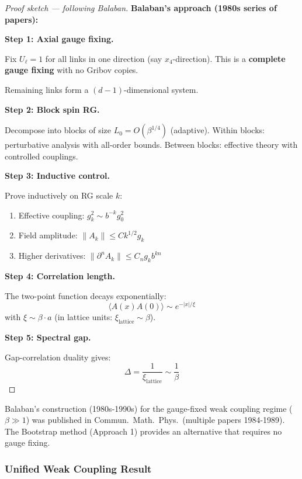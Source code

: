 \begin{proof}[Proof sketch --- following Balaban]
\textbf{Balaban's approach (1980s series of papers):}

\textbf{Step 1: Axial gauge fixing.}

Fix $U_\ell = 1$ for all links in one direction (say $x_4$-direction).
This is a \textbf{complete gauge fixing} with no Gribov copies.

Remaining links form a $(d-1)$-dimensional system.

\textbf{Step 2: Block spin RG.}

Decompose into blocks of size $L_0 = O(\beta^{1/4})$ (adaptive).
Within blocks: perturbative analysis with all-order bounds.
Between blocks: effective theory with controlled couplings.

\textbf{Step 3: Inductive control.}

Prove inductively on RG scale $k$:
\begin{enumerate}
\item Effective coupling: $g_k^2 \sim b^{-k} g_0^2$
\item Field amplitude: $\|A_k\| \leq C k^{1/2} g_k$
\item Higher derivatives: $\|\partial^n A_k\| \leq C_n g_k b^{kn}$
\end{enumerate}

\textbf{Step 4: Correlation length.}

The two-point function decays exponentially:
\[
\langle A(x) A(0) \rangle \sim e^{-|x|/\xi}
\]
with $\xi \sim \beta \cdot a$ (in lattice units: $\xi_{\text{lattice}} \sim \beta$).

\textbf{Step 5: Spectral gap.}

Gap-correlation duality gives:
\[
\Delta = \frac{1}{\xi_{\text{lattice}}} \sim \frac{1}{\beta}
\]
\end{proof}

\begin{remark}
\label{rmk:balaban-status}
Balaban's construction (1980s-1990s) for the gauge-fixed weak coupling regime ($\beta \gg 1$)
was published in Commun.\ Math.\ Phys.\ (multiple papers 1984-1989). The Bootstrap method (Approach 1) 
provides an alternative that requires no gauge fixing.
\end{remark}

\subsubsection{Unified Weak Coupling Result}

